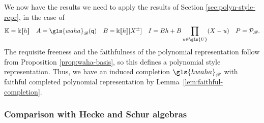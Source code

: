 \documentclass[10pt]{article}
\theoremstyle{definition}
\newcommand{\pq}{\mathsf{q}}
\newcommand{\K}{\Bbbk}%
\newcommand{\waha}{\gls{waha}}
\newcommand\llbracket{[\![}
\newcommand\rrbracket{]\!]}
\begin{document}
We now have the results we need to apply the results of Section
\ref{sec:polyn-style-repr}, in the case of
\begin{equation}
\mathbb{K}=\K\llbracket h\rrbracket \quad A=\waha_{\mathscr{B}}(\pq)\quad
 B=\K\llbracket h\rrbracket [X^{\pm}]\quad I=Bh+B \prod_{u\in \gls{U}}(X-u)\quad P=\mathcal{P}_{\mathscr{B}}.\label{eq:wHecke-PR}
\end{equation}
The requisite freeness and the faithfulness of the polynomial
representation follow from Proposition
\ref{prop:waha-basis}, so this defines a polynomial style
representation. Thus, we have an induced completion
$\gls{hwaha}_{\mathscr{B}}$ with faithful completed polynomial
representation by Lemma~\ref{lem:faithful-completion}.


\subsubsection{Comparison with Hecke and Schur algebras}
\label{sec:comp-with-hecke}
\end{document}

